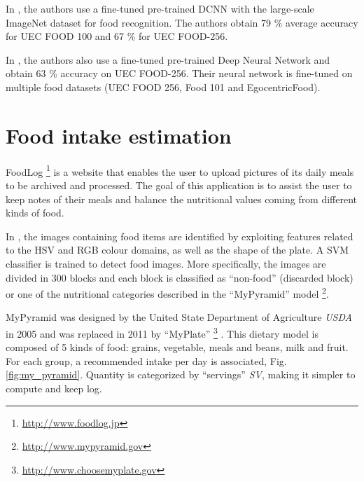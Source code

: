 
In \cite{Yanai2015}, the authors use a fine-tuned pre-trained DCNN with the large-scale ImageNet dataset for food recognition. The authors obtain 79 \% average accuracy for UEC FOOD 100 and 67 \% for UEC FOOD-256.

In \cite{Bolanos2016}, the authors also use a fine-tuned pre-trained Deep Neural Network and obtain 63 \% accuracy on UEC FOOD-256. Their neural network is fine-tuned on multiple food datasets (UEC FOOD 256, Food 101 and EgocentricFood).

\section{Food intake estimation}


FoodLog \footnote{\url{http://www.foodlog.jp}} is a website that enables the user to upload pictures of its daily meals to be archived and processed. The goal of this application is to assist the user to keep notes of their meals and balance the nutritional values coming from different kinds of food.

In \cite{Kitamura2008}, the images containing food items are identified by exploiting features related to the HSV and RGB colour domains, as well as the shape of the plate. A SVM classifier is trained to detect food images. More specifically, the images are divided in 300 blocks and each block is classified as \enquote{non-food} (discarded block) or one of the nutritional categories described in the \enquote{MyPyramid} model \footnote{\url{http://www.mypyramid.gov}}.

MyPyramid \cite{MyPyramid} was designed by the United State Department of Agriculture \textit{USDA} in 2005 and was replaced in 2011 by \enquote{MyPlate} \footnote{\url{http://www.choosemyplate.gov}} \cite{MyPlate}. This dietary model is composed of 5 kinds of food: grains, vegetable, meals and beans, milk and fruit. For each group, a recommended intake per day is associated, Fig. \ref{fig:my_pyramid}. Quantity is categorized by \enquote{servings} \textit{SV}, making it simpler to compute and keep log.

